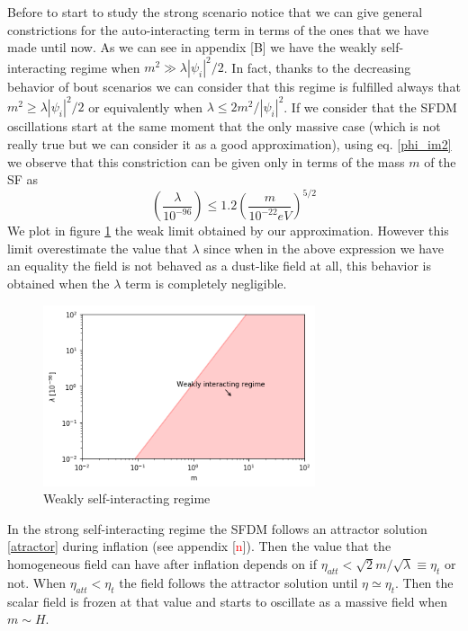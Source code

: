 \documentclass[twocolumn,           %
               showpacs,            %
               preprintnumbers,     %
               aps,                 %
               prl,          	    %
               letterpaper,             %
               superscriptaddress,      %
               nofootinbib,         %
               tightenlines,        %
               floats,floatfix      %
               ,usenatbib,
               ]{revtex4-1}
\begin{document}
Before to start to study the strong scenario notice that we can give general constrictions for the auto-interacting term in terms of the ones that we have made until now. As we can see in appendix [B] we have the weakly self-interacting regime when $m^2\gg \lambda|\psi_i|^2/2$. In fact, thanks to the decreasing behavior of bout scenarios we can consider that this regime is fulfilled always that $m^2\geq \lambda|\psi_i|^2/2$ or equivalently when $\lambda\leq 2m^2/|\psi_i|^2$. If we consider that the SFDM oscillations start at the same moment that the only massive case (which is not really true but we can consider it as a good approximation), using eq. \eqref{phi_im2} we observe that this constriction can be given only in terms of the mass $m$ of the SF as
\begin{equation}
\left(\frac{\lambda}{10^{-96}}\right)\leq 1.2\left(\frac{m}{10^{-22}eV}\right)^{5/2}
\end{equation}
We plot in figure \ref{weakregime} the weak limit obtained by our approximation. However this limit overestimate the value that $\lambda$ since when in the above expression we have an equality the field is not behaved as a dust-like field at all, this behavior is obtained when the $\lambda$ term is completely negligible.
\begin{figure}\label{weakregime}
\includegraphics[width=8cm]{weakregime.png}
\caption{Weakly self-interacting regime}
\end{figure} 

In the strong self-interacting regime the SFDM follows an attractor solution \eqref{atractor} during inflation (see appendix [\textcolor{red}{n}]). Then the value that the homogeneous field can have after inflation depends on if $\eta_{att}<\sqrt{2}m/\sqrt{\lambda}\equiv \eta_t$ or not. When $\eta_{att}<\eta_t$ the field follows the attractor solution until $\eta\simeq \eta_t$. Then the scalar field is frozen at that value and starts to oscillate as a massive field when $m\sim H$. 
\end{document}

